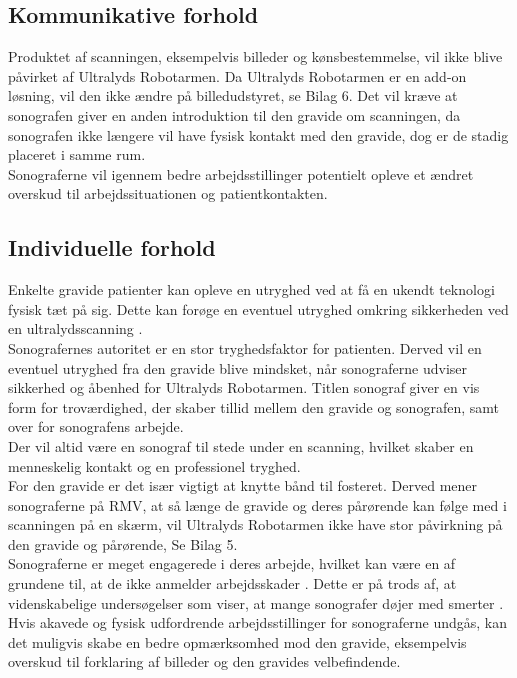 \subsection{Kommunikative forhold}
Produktet af scanningen, eksempelvis billeder og kønsbestemmelse, vil ikke blive påvirket af Ultralyds Robotarmen. Da Ultralyds Robotarmen er en add-on løsning, vil den ikke ændre på billedudstyret, se Bilag 6. 
Det vil kræve at sonografen giver en anden introduktion til den gravide om scanningen, da sonografen ikke længere vil have fysisk kontakt med den gravide, dog er de stadig placeret i samme rum.  \\
Sonograferne vil igennem bedre arbejdsstillinger potentielt opleve et ændret overskud til arbejdssituationen og patientkontakten.  

\subsection{Individuelle forhold}
Enkelte gravide patienter kan opleve en utryghed ved at få en ukendt teknologi fysisk tæt på sig. Dette kan forøge en eventuel utryghed omkring sikkerheden ved en ultralydsscanning \cite{29}. \\
Sonografernes autoritet er en stor tryghedsfaktor for patienten. Derved vil en eventuel utryghed fra den gravide blive mindsket, når sonograferne udviser sikkerhed og åbenhed for Ultralyds Robotarmen. Titlen sonograf giver en vis form for troværdighed, der skaber tillid mellem den gravide og sonografen, samt over for sonografens arbejde.\\
Der vil altid være en sonograf til stede under en scanning, hvilket skaber en menneskelig kontakt og en professionel tryghed.\\
For den gravide er det især vigtigt at knytte bånd til fosteret. Derved mener sonograferne på RMV, at så længe de gravide og deres pårørende kan følge med i scanningen på en skærm, vil Ultralyds Robotarmen ikke have stor påvirkning på den gravide og pårørende, Se Bilag 5. \\  
Sonograferne er meget engagerede i deres arbejde, hvilket kan være en af grundene til, at de ikke anmelder arbejdsskader \cite{1}\cite{24}. Dette er på trods af, at videnskabelige undersøgelser som viser, at mange sonografer døjer med smerter \cite{24}\cite{32}\cite{36}. 
Hvis akavede og fysisk udfordrende arbejdsstillinger for sonograferne undgås, kan det muligvis skabe en bedre opmærksomhed mod den gravide, eksempelvis overskud til forklaring af billeder og den gravides velbefindende. 
 
